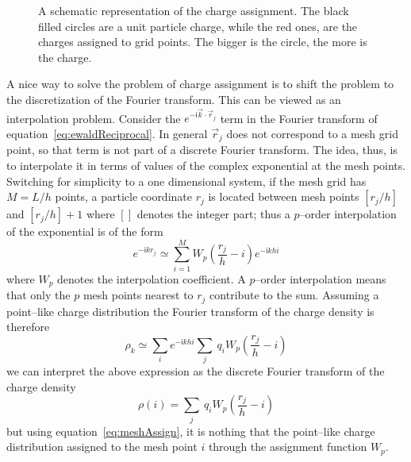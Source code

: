 \begin{figure}
	\caption{A schematic representation of the charge assignment. The black filled circles are a unit particle charge, while the red ones, are the charges assigned to grid points. The bigger is the circle, the more is the charge.}
	\label{fig:gidAssign}
\end{figure}

A nice way to solve the problem of charge assignment is to shift the problem to the discretization of the Fourier transform. This can be viewed as an interpolation problem. Consider the $e^{-\mathsf{i}\vec k\cdot \vec r_j}$ term in the Fourier transform of equation~\eqref{eq:ewaldReciprocal}. In general $\vec r_j$ does not correspond to a mesh grid point, so that term is not part of a discrete Fourier transform. The idea, thus, is to interpolate it in terms of values of the complex exponential at the mesh points. Switching for simplicity to a one dimensional system, if the mesh grid has $M = L/h$ points, a particle coordinate $r_j$ is located between mesh points $[r_j/h]$ and $[r_j/h] + 1$ where $[ ]$ denotes the integer part; thus a $p$--order interpolation of the exponential is of the form
\begin{equation*}
	e^{-\mathsf{i}kr_j} \simeq \sum_{i=1}^M W_{p}\left ( \frac{r_j}{h} - i \right ) e^{-\mathsf{i}khi}
\end{equation*}
where $W_{p}$ denotes the interpolation coefficient. A $p$--order interpolation means that only the $p$ mesh points nearest to $r_j$ contribute to the sum. Assuming a point--like charge distribution the Fourier transform of the charge density is therefore
\begin{equation*}
	\rho_k \simeq \sum_{i}e^{-\mathsf{i}khi} \sum_j\ q_iW_{p} \left ( \frac{r_j}{h} - i \right )
\end{equation*}
we can interpret the above expression as the discrete Fourier transform of the charge density
\begin{equation*}
	\rho(i) = \sum_j\ q_iW_{p} \left ( \frac{r_j}{h} - i \right )
\end{equation*}
but using equation~\eqref{eq:meshAssign}, it is nothing that the point--like charge distribution assigned to the mesh point $i$ through the assignment function $W_{p}$.

